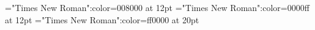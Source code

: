 \documentclass{article}
\begin{document}
 
\font\tctbta="Times New Roman":color=008000 at 12pt
\font\tbta="Times New Roman":color=0000ff at 12pt
\font\ta="Times New Roman":color=ff0000 at 20pt





\end{document}
